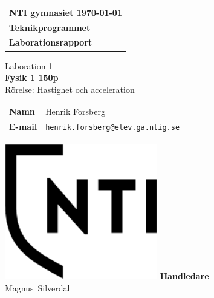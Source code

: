 \documentclass[11p, titlepage, oneside, a4paper]{article}
\makeatletter
\def\inst{Teknikprogrammet}
\def\typeofdoc{Laborationsrapport}
\def\course{Fysik 1 150p}
\def\pretitle{Laboration 1}
\def\title{Rörelse: Hastighet och acceleration}
\def\name{Henrik Forsberg}
\def\username{henrik.forsberg}
\def\email{\username{}@elev.ga.ntig.se}
\def\graders{Magnus Silverdal}
\makeatother
\begin{document}
\begin{titlepage}
		\thispagestyle{empty}
		\begin{large}
			\begin{tabular}{@{}p{\textwidth}@{}}
				\textbf{NTI gymnasiet \hfill \today} \\
				\textbf{\inst} \\
				\textbf{\typeofdoc} \\
			\end{tabular}
		\end{large}
		\vspace{10mm}
		\begin{center}
			\LARGE{\pretitle} \\
			\huge{\textbf{\course}}\\
			\vspace{10mm}
			\LARGE{\title} \\
			\vspace{15mm}
			\begin{large}
				\begin{tabular}{ll}
					\textbf{Namn} & \name \\
					\textbf{E-mail} & \texttt{\email} \\
				\end{tabular}
			\end{large}
			\vfill
            \includegraphics[width=0.5\textwidth]{images/NTI Gymnasiet_Symbol_print_svart.png}
			\vfill
            \large{\textbf{Handledare}}\\
			\mbox{\large{\graders}}
		\end{center}
	\end{titlepage}

    \begin{otherlanguage}{english}
	\begin{abstract}
        This is the ``sammanfattning'', it is written in english and called the abstract.      
    \end{abstract}
    \end{otherlanguage}
	\tableofcontents
	
\end{document}
